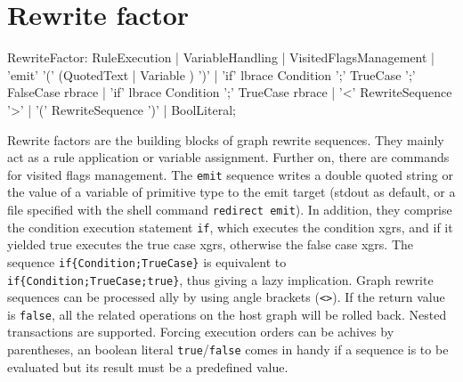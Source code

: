 \section{Rewrite factor}

\begin{rail} 
  RewriteFactor: 
    RuleExecution |
    VariableHandling |
	VisitedFlagsManagement |
	'emit' '(' (QuotedText | Variable ) ')' |
	'if' lbrace Condition ';' TrueCase ';' FalseCase rbrace |
	'if' lbrace Condition ';' TrueCase rbrace |
    '<' RewriteSequence '>' | 
    '(' RewriteSequence ')' |
    BoolLiteral;
\end{rail}\indexmain{\texttt{<>}}

Rewrite factors are the building blocks of graph rewrite sequences.
They mainly act as a rule application or variable assignment.
Further on, there are commands for visited flags management.
The \texttt{emit} sequence writes a double quoted string or the value of a variable of primitive type to the emit target (stdout as default, or a file specified with the shell command \texttt{redirect emit}).
In addition, they comprise the condition execution statement \texttt{if}, which executes the condition xgrs, and if it yielded true executes the true case xgrs, otherwise the false case xgrs.
The sequence \verb#if{Condition;TrueCase}# is equivalent to \verb#if{Condition;TrueCase;true}#, thus giving a lazy implication.
Graph rewrite sequences can be processed ally by using angle brackets (\texttt{<>}).
If the return value is \texttt{false}, all the related operations on the host graph will be rolled back.
Nested transactions are supported.
Forcing execution orders can be achives by parentheses, an boolean literal \texttt{true}/\texttt{false} comes in handy if a sequence is to be evaluated but its result must be a predefined value.

